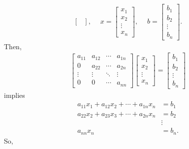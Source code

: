 \documentclass{report}
\begin{document}
\begin{itemize}
\begin{align*}
\begin{bmatrix}
                \end{bmatrix},  \quad \;
                x = \begin{bmatrix}
                    x_{1} \\ x_{2} \\ \vdots \\ x_{n}
                \end{bmatrix}, \quad \;
                b = \begin{bmatrix}
                    b_{1} \\ b_{2} \\ \vdots \\ b_{n}
                \end{bmatrix}
            .\end{align*}
            Then, 
            \begin{align*}
                 \begin{bmatrix}
                    a_{11} & a_{12} & \cdots & a_{1n} \\
                    0 & a_{22} & \cdots & a_{2n} \\
                    \vdots & \vdots & \ddots & \vdots \\
                    0 & 0 & \cdots & a_{nn}
                \end{bmatrix}
                \begin{bmatrix}
                    x_{1} \\ x_{2} \\ \vdots \\ x_{n}
                \end{bmatrix} 
                = \begin{bmatrix}
                    b_{1} \\ b_{2} \\ \vdots \\ b_{n}
                \end{bmatrix}
            \end{align*}
            implies
            \begin{align*}
                a_{11}x_{1} + a_{12}x_{2} + \cdots + a_{1n}x_{n} &= b_{1} \\
                a_{22}x_{2} + a_{23}x_{3} + \cdots + a_{2n}x_{n} &= b_{2} \\
                                                                 &\vdots \\
                a_{nn} x_{n} &= b_{n}
            .\end{align*}
            So, 

\end{itemize}
\end{document}
